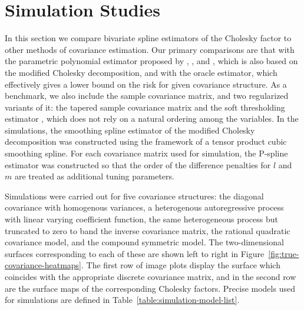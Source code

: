 \chapter{Simulation Studies} \label{simulation-studies-chapter}


In this section we compare bivariate spline estimators of the Cholesky factor to other methods of covariance estimation. Our primary comparisons are that with the parametric polynomial estimator proposed by \cite{pourahmadi1999joint},  \cite{pan2003modelling}, and \cite{pourahmadi2002dynamic}, which is also based on the modified Cholesky decomposition, and with the oracle estimator, which effectively gives a lower bound on the risk for given covariance structure. As a benchmark, we also include the sample covariance matrix, and two regularized variants of it: the tapered sample covariance matrix \citep{cai2010optimal} and the soft thresholding estimator \citep{rothman2009generalized}, which does not rely on a natural ordering among the variables. In the simulations, the smoothing spline estimator of the modified Cholesky decomposition was constructed using the framework of a tensor product cubic smoothing spline. For each covariance matrix used for simulation, the P-spline estimator was constructed so that the order of the difference penalties for $l$ and $m$ are treated as additional tuning parameters.

\bigskip

Simulations were carried out for five covariance structures: the diagonal covariance with homogenous variances, a heterogenous autoregressive process with linear varying coefficient function, the same heterogeneous process but truncated to zero to band the inverse covariance matrix, the rational quadratic covariance model, and the compound symmetric model. The two-dimensional surfaces corresponding to each of these are shown left to right in Figure~\ref{fig:true-covariance-heatmaps}. The first row of image plots display the surface which coincides with the appropriate discrete covariance matrix, and in the second row are the surface maps of the corresponding Cholesky factors. Precise models used for simulations are defined in Table~\ref{table:simulation-model-list}. 

